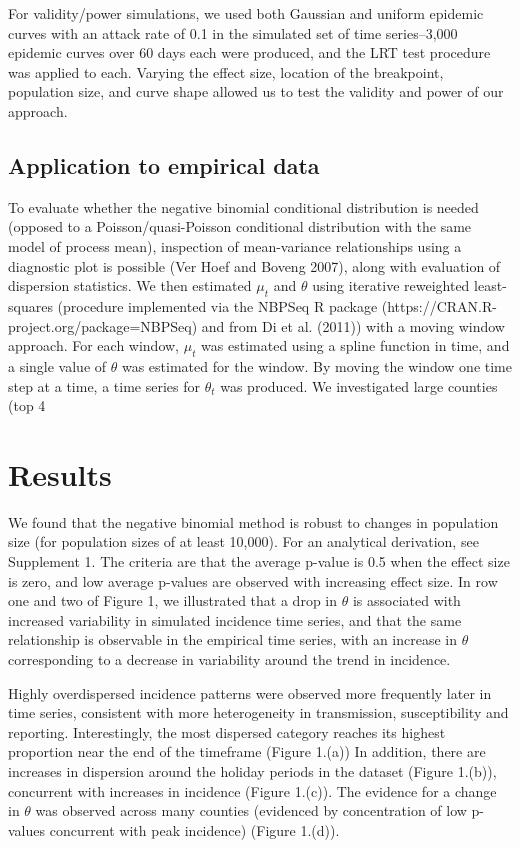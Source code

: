 \documentclass[10pt,letterpaper]{article}
\begin{document}
For validity/power simulations, we used both Gaussian and uniform epidemic curves with an attack rate of 0.1 in the simulated set of time series--3,000 epidemic curves over 60 days each were produced, and the LRT test procedure was applied to each. Varying the effect size, location of the breakpoint, population size, and curve shape allowed us to test the validity and power of our approach.

\subsection*{Application to empirical data}
To evaluate whether the negative binomial conditional distribution is needed (opposed to a Poisson/quasi-Poisson conditional distribution with the same model of process mean), inspection of mean-variance relationships using a diagnostic plot is possible (Ver Hoef and Boveng 2007), along with evaluation of dispersion statistics.
We then estimated $\mu_t$ and $\theta$ using iterative reweighted least-squares (procedure implemented via the NBPSeq R package (https://CRAN.R-project.org/package=NBPSeq) and from Di et al. (2011)) with a moving window approach. For each window, $\mu_t$ was estimated using a spline function in time, and a single value of $\theta$ was estimated for the window. By moving the window one time step at a time, a time series for $\theta_t$ was produced. We investigated large counties (top 4%

\section*{Results}
We found that the negative binomial method is robust to changes in population size (for population sizes of at least 10,000). For an analytical derivation, see Supplement 1. The criteria are that the average p-value is 0.5 when the effect size is zero, and low average p-values are observed with increasing effect size. In row one and two of Figure 1, we illustrated that a drop in $\theta$ is associated with increased variability in simulated incidence time series, and that the same relationship is observable in the empirical time series, with an increase in $\theta$ corresponding to a decrease in variability around the trend in incidence.

Highly overdispersed incidence patterns were observed more frequently later in time series, consistent with more heterogeneity in transmission, susceptibility and reporting. Interestingly, the most dispersed category reaches its highest proportion near the end of the timeframe (Figure 1.(a)) In addition, there are increases in dispersion around the holiday periods in the dataset (Figure 1.(b)), concurrent with increases in incidence (Figure 1.(c)). The evidence for a change in $\theta$ was observed across many counties (evidenced by concentration of low p-values concurrent with peak incidence) (Figure 1.(d)).
\end{document}
